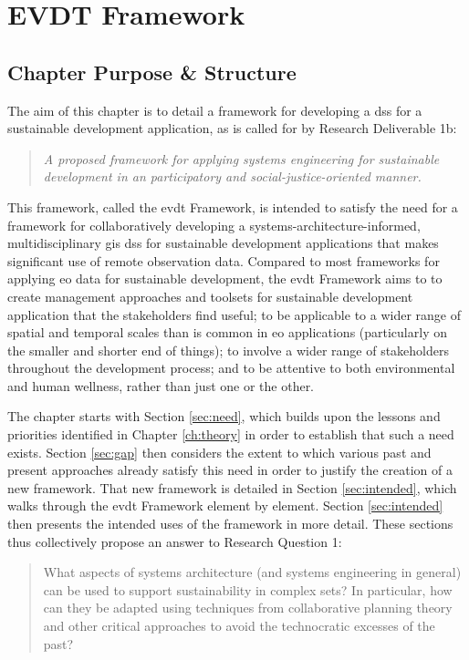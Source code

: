 \chapter{EVDT Framework} \label{ch:evdt}

\section{Chapter Purpose \& Structure}

The aim of this chapter is to detail a framework for developing a \acf{dss} for a sustainable development application, as is called for by Research Deliverable 1b:

\blockquote{\textit{A proposed framework for applying systems engineering for sustainable development in an participatory and social-justice-oriented manner.}} 

This framework, called the \acf{evdt} Framework, is intended to satisfy the need for a framework for collaboratively developing a systems-architecture-informed, multidisciplinary \ac{gis} \ac{dss} for sustainable development applications that makes significant use of remote observation data. Compared to most frameworks for applying \acf{eo} data for sustainable development, the \ac{evdt} Framework aims to to create management approaches and toolsets for sustainable development application that the stakeholders find useful; to be applicable to a wider range of spatial and temporal scales than is common in \ac{eo} applications (particularly on the smaller and shorter end of things); to involve a wider range of stakeholders throughout the development process; and to be attentive to both environmental and human wellness, rather than just one or the other. 

The chapter starts with Section \ref{sec:need}, which builds upon the lessons and priorities identified in Chapter \ref{ch:theory} in order to establish that such a need exists. Section \ref{sec:gap} then considers the extent to which various past and present approaches already satisfy this need in order to justify the creation of a new framework. That new framework is detailed in Section \ref{sec:intended}, which walks through the \ac{evdt} Framework element by element. Section \ref{sec:intended} then presents the intended uses of the framework in more detail. These sections thus collectively propose an answer to Research Question 1: 

\blockquote{What aspects of systems architecture (and systems engineering in general) can be used to support sustainability in complex \ac{sets}? In particular, how can they be adapted using techniques from collaborative planning theory and other critical approaches to avoid the technocratic excesses of the past?}

